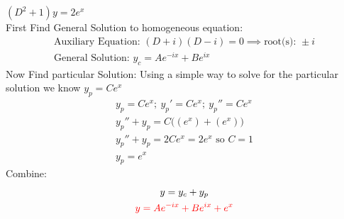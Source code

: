 \item [5.] $(D^2+1)y=2e^{x}$\\[2mm]
First Find General Solution to homogeneous equation:
\begin{gather*}
    \text{Auxiliary Equation: } (D+i)(D-i)=0 \implies \text{root(s): } \pm i\\
    \text{General Solution: } y_c=Ae^{-ix}+Be^{ix}
\end{gather*}
Now Find particular Solution:
Using a simple way to solve for the particular solution we know $y_p=Ce^{x}$
\begin{gather*}
    y_p=Ce^{x};\:y_p'=Ce^{x};\:y_p''=Ce^{x}\\
    y_p''+y_p=C\big((e^{x})+(e^{x})\big)\\
    y_p''+y_p=2Ce^{x} = 2e^{x} \text{ so } C=1\\
    y_p = e^{x}
\end{gather*}
Combine:
\begin{gather*}
    y=y_c+y_p\\
    \textcolor{red}{y = Ae^{-ix}+Be^{ix}+e^x}
\end{gather*}